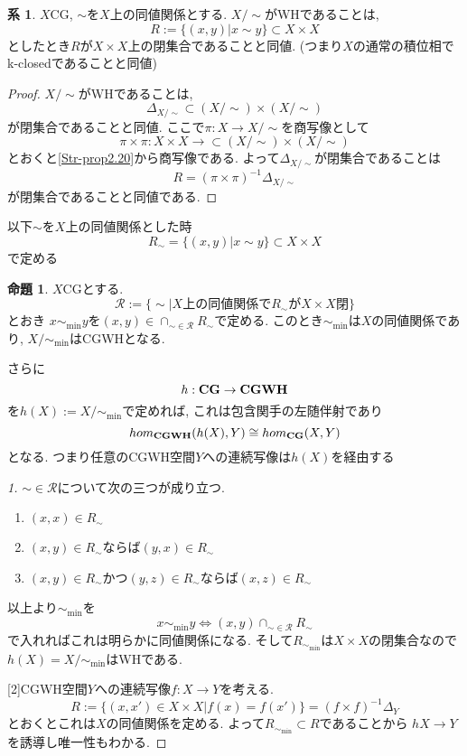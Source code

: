 \documentclass[dvipdfmx,a4paper,11pt]{article}
\theoremstyle{definition}
\newtheorem{prop}[thm]{命題}
\newtheorem{cor}[thm]{系}
\begin{document}
\begin{cor}\cite[Cor2.21]{Str}
\label{Str-cor2.21}
$X$CG, $\sim$を$X$上の同値関係とする. 
$X/\sim $がWHであることは, 
$$
R:= \{ (x,y)| x \sim y\} \subset X \times X
$$
としたとき$R$が$X \times X$上の閉集合であることと同値.
(つまり$X$の通常の積位相でk-closedであることと同値)
\end{cor}
\begin{proof}
$X/\sim $がWHであることは,
$$
\Delta_{X/\sim} \subset (X/\sim) \times (X/\sim)
$$
が閉集合であることと同値.
ここで$\pi : X \to X/\sim$を商写像として
$$
\pi \times \pi : X \times X \to \subset (X/\sim) \times (X/\sim)
$$
とおくと\ref{Str-prop2.20}から商写像である.
よって$\Delta_{X/\sim} $が閉集合であることは
$$
R = (\pi \times \pi )^{-1}\Delta_{X/\sim} 
$$
が閉集合であることと同値である.
\end{proof}

以下$\sim$を$X$上の同値関係とした時
$$
R_{\sim}= \{ (x,y)| x \sim y\} \subset X \times X
$$
で定める
 \begin{tcolorbox}
 [colback = white, colframe = green!35!black, fonttitle = \bfseries,breakable = true]
\begin{prop}\cite[Prop2.22]{Str}
$X$CGとする.
$$
\mathcal{R}:=\{\sim | \text{$X$上の同値関係で$R_{\sim}$が$X \times X$閉} \}
$$
とおき
$x \sim_{\min} y$を$(x,y) \in \cap_{\sim \in \mathcal{R}} R_{\sim}$で定める.
このとき$\sim_{\min}$は$X$の同値関係であり, $X/\sim_{\min}$はCGWHとなる.

さらに
$$
h : {\bf CG } \to {\bf CGWH}
$$
を$h(X) := X/\sim_{\min}$で定めれば, これは包含関手の左随伴射であり
$$
hom_{{\bf CGWH}}(h(X), Y) \cong hom_{{\bf CG}}(X, Y)
$$
となる. 
つまり任意のCGWH空間$Y$への連続写像は$h(X)$を経由する

\end{prop}
\end{tcolorbox}

\begin{proof}
[1]$\sim \in \mathcal{R}$について次の三つが成り立つ.
\begin{enumerate}
\item $(x,x) \in R_{\sim}$
\item $(x,y)\in R_{\sim}$ならば$(y,x) \in R_{\sim}$
\item $(x,y) \in R_{\sim}$かつ$(y,z) \in R_{\sim}$ならば$(x,z) \in R_{\sim}$
\end{enumerate}
以上より$\sim_{\min}$を
$$
x \sim_{\min} y
\Leftrightarrow
(x,y) \cap_{\sim \in \mathcal{R}} R_{\sim}
$$
で入れればこれは明らかに同値関係になる.
そして$R_{\sim_{\min}}$は$X \times X$の閉集合なので$h(X)=X/\sim_{\min}$はWHである.

[2]CGWH空間$Y$への連続写像$f : X \to Y$を考える.
$$
R:= \{ (x, x') \in X \times X | f(x) = f(x')\}=(f \times f)^{-1}\Delta_{Y}
$$
とおくとこれは$X$の同値関係を定める.
よって$R_{\sim_{\min}} \subset R$であることから
$hX \to Y$を誘導し唯一性もわかる.  
\end{proof}
\end{document}
